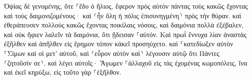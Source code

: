 \documentclass{openreader}
\begin{document}
Ὀψίας δὲ γενομένης, ὅτε ⸀ἔδυ ὁ ἥλιος, ἔφερον πρὸς αὐτὸν πάντας τοὺς κακῶς ἔχοντας καὶ τοὺς δαιμονιζομένους· 
καὶ ⸂ἦν ὅλη ἡ πόλις ἐπισυνηγμένη⸃ πρὸς τὴν θύραν. 
καὶ ἐθεράπευσεν πολλοὺς κακῶς ἔχοντας ποικίλαις νόσοις, καὶ δαιμόνια πολλὰ ἐξέβαλεν, καὶ οὐκ ἤφιεν λαλεῖν τὰ δαιμόνια, ὅτι ᾔδεισαν ⸀αὐτόν. 
Καὶ πρωῒ ἔννυχα λίαν ἀναστὰς ἐξῆλθεν καὶ ἀπῆλθεν εἰς ἔρημον τόπον κἀκεῖ προσηύχετο. 
καὶ ⸀κατεδίωξεν αὐτὸν ⸀Σίμων καὶ οἱ μετ’ αὐτοῦ, 
καὶ ⸂εὗρον αὐτὸν καὶ⸃ λέγουσιν αὐτῷ ὅτι Πάντες ⸂ζητοῦσίν σε⸃. 
καὶ λέγει αὐτοῖς· Ἄγωμεν ⸀ἀλλαχοῦ εἰς τὰς ἐχομένας κωμοπόλεις, ἵνα καὶ ἐκεῖ κηρύξω, εἰς τοῦτο γὰρ ⸀ἐξῆλθον. 
\end{document}
